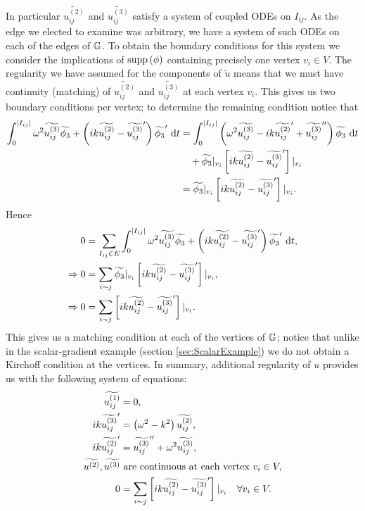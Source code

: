 In particular $\widetilde{u_{ij}^{(2)}}$ and $\widetilde{u_{ij}^{(3)}}$ satisfy a system of coupled ODEs on $I_{ij}$.
As the edge we elected to examine was arbitrary, we have a system of such ODEs on each of the edges of $\mathbb{G}$.
To obtain the boundary conditions for this system we consider the implications of $\mathrm{supp}\left( \phi \right)$ containing precisely one vertex $v_i\in V$.
The regularity we have assumed for the components of $\widetilde{u}$ means that we must have continuity (matching) of $\widetilde{u_{ij}^{(2)}}$ and $\widetilde{u_{ij}^{(3)}}$ at each vertex $v_i$.
This gives us two boundary conditions per vertex; to determine the remaining condition notice that
\begin{align*}
	\int_0^{\lvert I_{ij} \rvert} \omega^2\widetilde{u_{ij}^{(3)}}\widetilde{\phi_3} + \left( ik\widetilde{u_{ij}^{(2)}} - \widetilde{u_{ij}^{(3)}}' \right)\widetilde{\phi_3}' \ \mathrm{d} t 
	&= \int_0^{\lvert I_{ij} \rvert} \left( \omega^2\widetilde{u_{ij}^{(3)}} - ik\widetilde{u_{ij}^{(2)}}'  + \widetilde{u_{ij}^{(3)}}'' \right)\widetilde{\phi_3} \ \mathrm{d} t \\
	&\quad + \widetilde{\phi_3}\vert_{v_i}\left[ ik\widetilde{u_{ij}^{(2)}}-\widetilde{u_{ij}^{(3)}}' \right]\vert_{v_i} \\
	&= \widetilde{\phi_3}\vert_{v_i}\left[ ik\widetilde{u_{ij}^{(2)}}-\widetilde{u_{ij}^{(3)}}' \right]\vert_{v_i}.
\end{align*}
Hence
\begin{align*}
	0 &= \sum_{I_{ij}\in E} \int_0^{\lvert I_{ij} \rvert} \omega^2\widetilde{u_{ij}^{(3)}}\widetilde{\phi_3} + \left( ik\widetilde{u_{ij}^{(2)}} - \widetilde{u_{ij}^{(3)}}' \right)\widetilde{\phi_3}' \ \mathrm{d} t, \\
	\Rightarrow 0 &= \sum_{i\sim j} \widetilde{\phi_3}\vert_{v_i}\left[ ik\widetilde{u_{ij}^{(2)}}-\widetilde{u_{ij}^{(3)}}' \right]\vert_{v_i}, \\
	\Rightarrow 0 &= \sum_{i\sim j} \left[ ik\widetilde{u_{ij}^{(2)}}-\widetilde{u_{ij}^{(3)}}' \right]\vert_{v_i}.
\end{align*}
This gives us a matching condition at each of the vertices of $\mathbb{G}$; notice that unlike in the scalar-gradient example (section \ref{sec:ScalarExample}) we do not obtain a Kirchoff condition at the vertices.
In summary, additional regularity of $u$ provides us with the following system of equations:
\begin{subequations} \label{eq:VectorEdgeEquationsSystem}
	\begin{align}
		\widetilde{u_{ij}^{(1)}} &= 0, \\
		ik\widetilde{u_{ij}^{(3)}}' &= \left( \omega^2-k^2 \right)\widetilde{u_{ij}^{(2)}}, \\
		ik\widetilde{u_{ij}^{(2)}}' &= \widetilde{u_{ij}^{(3)}}'' + \omega^2\widetilde{u_{ij}^{(3)}}, \\
		\widetilde{u^{(2)}}, \widetilde{u^{(3)}} &\text{ are continuous at each vertex } v_i\in V, \\
		0 &= \sum_{i\sim j} \left[ ik\widetilde{u_{ij}^{(2)}}-\widetilde{u_{ij}^{(3)}}' \right]\vert_{v_i} \quad \forall v_i\in V.
	\end{align}
\end{subequations}